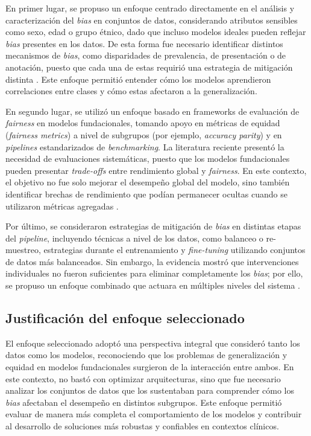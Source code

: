 En primer lugar, se propuso un enfoque centrado directamente en el análisis y caracterización del \textit{bias} en conjuntos de datos, considerando atributos sensibles como sexo, edad o grupo étnico, dado que incluso modelos ideales pueden reflejar \textit{bias} presentes en los datos. De esta forma fue necesario identificar distintos mecanismos de \textit{bias}, como disparidades de prevalencia, de presentación o de anotación, puesto que cada una de estas requirió una estrategia de mitigación distinta \parencite{jones2024causal}. Este enfoque permitió entender cómo los modelos aprendieron correlaciones entre clases y cómo estas afectaron a la generalización.

En segundo lugar, se utilizó un enfoque basado en frameworks de evaluación de \textit{fairness} en modelos fundacionales, tomando apoyo en métricas de equidad (\textit{fairness metrics}) a nivel de subgrupos (por ejemplo, \textit{accuracy parity}) y en \textit{pipelines} estandarizados de \textit{benchmarking}. La literatura reciente presentó la necesidad de evaluaciones sistemáticas, puesto que los modelos fundacionales pueden presentar \textit{trade-offs} entre rendimiento global y \textit{fairness}. En este contexto, el objetivo no fue solo mejorar el desempeño global del modelo, sino también identificar brechas de rendimiento que podían permanecer ocultas cuando se utilizaron métricas agregadas \parencite{NEURIPS2024_c9826b9e}.

Por último, se consideraron estrategias de mitigación de \textit{bias} en distintas etapas del \textit{pipeline}, incluyendo técnicas a nivel de los datos, como balanceo o re-muestreo, estrategias durante el entrenamiento y \textit{fine-tuning} utilizando conjuntos de datos más balanceados. Sin embargo, la evidencia mostró que intervenciones individuales no fueron suficientes para eliminar completamente los \textit{bias}; por ello, se propuso un enfoque combinado que actuara en múltiples niveles del sistema \parencite{khan23a}.

\subsection{Justificación del enfoque seleccionado}

El enfoque seleccionado adoptó una perspectiva integral que consideró tanto los datos como los modelos, reconociendo que los problemas de generalización y equidad en modelos fundacionales surgieron de la interacción entre ambos. En este contexto, no bastó con optimizar arquitecturas, sino que fue necesario analizar los conjuntos de datos que los sustentaban para comprender cómo los \textit{bias} afectaban el desempeño en distintos subgrupos. Este enfoque permitió evaluar de manera más completa el comportamiento de los modelos y contribuir al desarrollo de soluciones más robustas y confiables en contextos clínicos.

